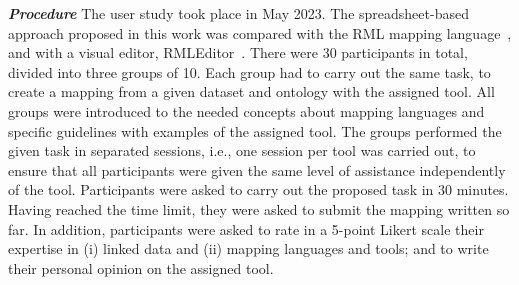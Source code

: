 

\noindent\textit{\textbf{Procedure}} 
The user study took place in May 2023. %
The spreadsheet-based approach proposed in this work was compared with the RML mapping language~\parencite{Dimou2014rml}, and with a visual editor, RMLEditor~\parencite{heyvaert2016rmleditor}. There were 30 participants in total, divided into three groups of 10. Each group had to carry out the same task, to create a mapping from a given dataset and ontology with the assigned tool. All groups were introduced to the needed concepts about mapping languages and specific guidelines with examples of the assigned tool. The groups performed the given task in separated sessions, i.e., one session per tool was carried out, to ensure that all participants were given the same level of assistance independently of the tool. Participants were asked to carry out the proposed task in 30 minutes. Having reached the time limit, they were asked to submit the mapping written so far. In addition, participants were asked to rate in a 5-point Likert scale their expertise in (i) linked data and (ii) mapping languages and tools; and to write their personal opinion on the assigned tool.


